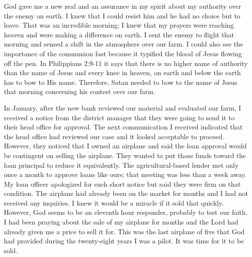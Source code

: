 \documentclass[twoside, 12pt]{book}
\begin{document}
God gave me a new zeal and an assurance in my spirit about my authority over the enemy on earth. I knew that I could resist him and he had no choice but to leave. That was an incredible morning; I knew that my prayers were reaching heaven and were making a difference on earth. I sent the enemy to flight that morning and sensed a shift in the atmosphere over our farm. I could also see the importance of the communion fast because it typified the blood of Jesus flowing off the pen. In Philippians 2:9-11 it says that there is no higher name of authority than the name of Jesus and every knee in heaven, on earth and below the earth has to bow to His name. Therefore, Satan needed to bow to the name of Jesus that morning concerning his contest over our farm. 

In January, after the new bank reviewed our material and evaluated our farm, I received a notice from the district manager that they were going to send it to their head office for approval. The next communication I received indicated that the head office had reviewed our case and it looked acceptable to proceed. However, they noticed that I owned an airplane and said the loan approval would be contingent on selling the airplane. They wanted to put those funds toward the loan principal to reduce it equivalently. The agricultural-based lender met only once a month to approve loans like ours; that meeting was less than a week away. My loan officer apologized for such short notice but said they were firm on that condition. The airplane had already been on the market for months and I had not received any inquiries. I knew it would be a miracle if it sold that quickly. However, God seems to be an eleventh hour responder, probably to test our faith. I had been praying about the sale of my airplane for months and the Lord had already given me a price to sell it for. This was the last airplane of five that God had provided during the twenty-eight years I was a pilot. It was time for it to be sold.
\end{document}
